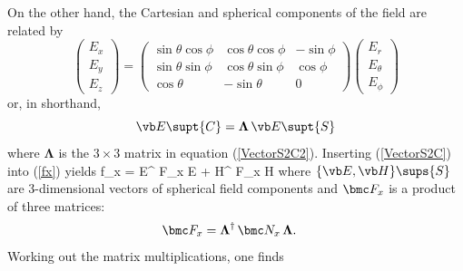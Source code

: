\documentclass[letterpaper]{article}
\begin{document}
On the other hand, the Cartesian and spherical components of the field
are related by 
\begin{equation} 
\left(\begin{array}{c} E_x \\ E_y \\ E_z \end{array}\right)
=
\left(\begin{array}{ccc}
\sin\theta\cos\phi & 
\cos\theta\cos\phi & 
-\sin\phi
\\
\sin\theta\sin\phi & 
\cos\theta\sin\phi & 
\cos\phi
\\
\cos\theta         &
-\sin\theta        &
0
\end{array}\right)
\left(\begin{array}{c} E_r \\ E_\theta \\ E_\phi\end{array}\right)
\label{VectorS2C}
\end{equation}
or, in shorthand, 
\begin{equation}
 \vb E\supt{C} = \boldsymbol{\Lambda} \, \vb E\supt{S}
\label{VectorS2C2}
\end{equation} 
where $\boldsymbol{\Lambda}$ is the $3\times 3$ matrix 
in equation (\ref{VectorS2C2}). Inserting (\ref{VectorS2C}) into 
(\ref{fx}) yields
{
 f_x  
=  \vb E^{\dagger} \bmc F_x \vb E
 + \vb H^{\dagger} \bmc F_x \vb H
}
where $\{\vb E, \vb H\}\sups{S}$ are 3-dimensional vectors of spherical
field components and $\bmc F_x$ is a product of three matrices:
\begin{align*}
\bmc F_x&=\boldsymbol{\Lambda}^\dagger \, \bmc N_x \, \boldsymbol{\Lambda}.
\end{align*}
Working out the matrix multiplications, one finds
\end{document}

